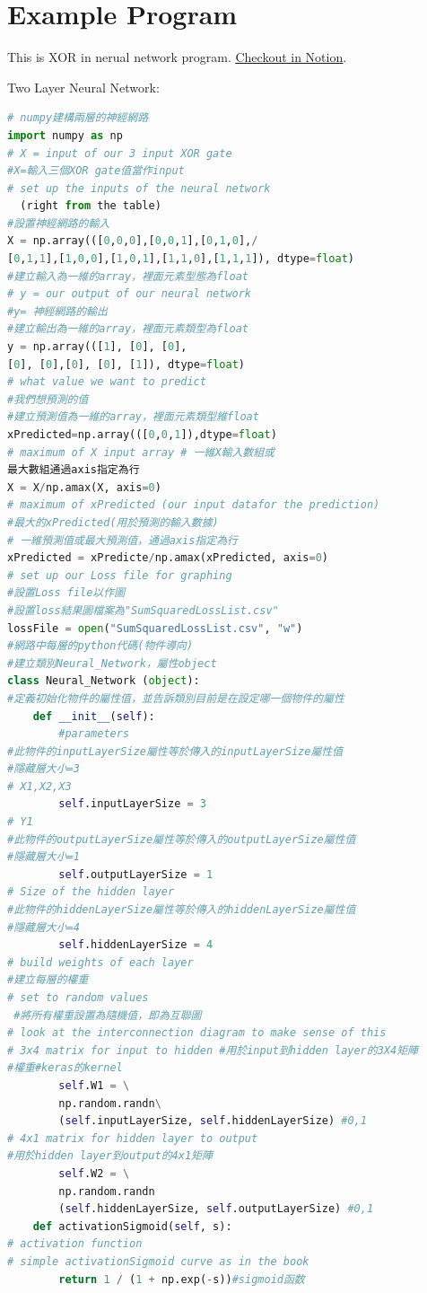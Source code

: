 \documentclass[12pt,a4paper]{article}
\begin{document}
\section{Example Program}
This is XOR in nerual network program.
\href{https://www.notion.so/code-40723115-eac4c4cacdaa4ee38ecaa3275b4cac81}{\underline{Checkout in Notion}}.\\
\begin{Large}Two Layer Neural Network:\end{Large}
\begin{flushleft}
\begin{lstlisting}[language=python]
# numpy建構兩層的神經網路
import numpy as np
# X = input of our 3 input XOR gate
#X=輸入三個XOR gate值當作input
# set up the inputs of the neural network 
  (right from the table)
#設置神經網路的輸入
X = np.array(([0,0,0],[0,0,1],[0,1,0],/
[0,1,1],[1,0,0],[1,0,1],[1,1,0],[1,1,1]), dtype=float)
#建立輸入為一維的array，裡面元素型態為float
# y = our output of our neural network
#y= 神經網路的輸出
#建立輸出為一維的array，裡面元素類型為float
y = np.array(([1], [0], [0], 
[0], [0],[0], [0], [1]), dtype=float)
# what value we want to predict
#我們想預測的值
#建立預測值為一維的array，裡面元素類型維float
xPredicted=np.array(([0,0,1]),dtype=float)
# maximum of X input array # 一維X輸入數組或
最大數組通過axis指定為行
X = X/np.amax(X, axis=0) 
# maximum of xPredicted (our input datafor the prediction)
#最大的xPredicted(用於預測的輸入數據)
# 一維預測值或最大預測值，通過axis指定為行
xPredicted = xPredicte/np.amax(xPredicted, axis=0)
# set up our Loss file for graphing
#設置Loss file以作圖
#設置loss結果圖檔案為"SumSquaredLossList.csv"
lossFile = open("SumSquaredLossList.csv", "w")
#網路中每層的python代碼(物件導向)
#建立類別Neural_Network，屬性object
class Neural_Network (object):
#定義初始化物件的屬性值，並告訴類別目前是在設定哪一個物件的屬性
    def __init__(self):
        #parameters
#此物件的inputLayerSize屬性等於傳入的inputLayerSize屬性值
#隱藏層大小=3
# X1,X2,X3
        self.inputLayerSize = 3
# Y1 
#此物件的outputLayerSize屬性等於傳入的outputLayerSize屬性值 
#隱藏層大小=1
        self.outputLayerSize = 1 
# Size of the hidden layer
#此物件的hiddenLayerSize屬性等於傳入的hiddenLayerSize屬性值 
#隱藏層大小=4
        self.hiddenLayerSize = 4 
# build weights of each layer 
#建立每層的權重
# set to random values
 #將所有權重設置為隨機值，即為互聯圖
# look at the interconnection diagram to make sense of this
# 3x4 matrix for input to hidden #用於input到hidden layer的3X4矩陣
#權重#keras的kernel
        self.W1 = \
        np.random.randn\
        (self.inputLayerSize, self.hiddenLayerSize) #0,1
# 4x1 matrix for hidden layer to output 
#用於hidden layer到output的4x1矩陣
        self.W2 = \
        np.random.randn
        (self.hiddenLayerSize, self.outputLayerSize) #0,1
    def activationSigmoid(self, s):
# activation function
# simple activationSigmoid curve as in the book
        return 1 / (1 + np.exp(-s))#sigmoid函数


\end{lstlisting}
\end{flushleft}
\end{document}
